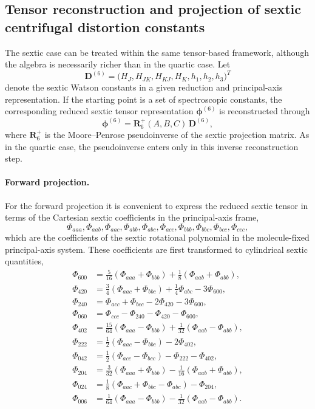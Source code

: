 \subsection{Tensor reconstruction and projection of sextic centrifugal distortion constants}

The sextic case can be treated within the same tensor-based framework,
although the algebra is necessarily richer than in the quartic case.
Let
\[
\mathbf D^{(6)} =
\bigl(
H_J,H_{JK},H_{KJ},H_K,h_1,h_2,h_3
\bigr)^T
\]
denote the sextic Watson constants in a given reduction and principal-axis
representation.  If the starting point is a set of spectroscopic constants, the
corresponding reduced sextic tensor representation
$\boldsymbol\phi^{(6)}$ is reconstructed through
\begin{equation}
\boldsymbol\phi^{(6)}=
\mathbf R_6^{+}(A,B,C)\,\mathbf D^{(6)},
\label{eq:sextic_pseudoinverse}
\end{equation}
where $\mathbf R_6^{+}$ is the Moore--Penrose pseudoinverse of the sextic
projection matrix.  As in the quartic case, the pseudoinverse enters only in
this inverse reconstruction step.

\paragraph{Forward projection.}

For the forward projection it is convenient to express the reduced sextic tensor
in terms of the Cartesian sextic coefficients in the principal-axis frame,
\[
\Phi_{aaa},\Phi_{aab},\Phi_{aac},\Phi_{abb},\Phi_{abc},\Phi_{acc},
\Phi_{bbb},\Phi_{bbc},\Phi_{bcc},\Phi_{ccc},
\]
which are the coefficients of the sextic rotational polynomial in the
molecule-fixed principal-axis system.
These coefficients are first transformed to cylindrical sextic quantities,
\begin{align}
\Phi_{600} &= \frac{5}{16}(\Phi_{aaa}+\Phi_{bbb})
+\frac{1}{8}(\Phi_{aab}+\Phi_{abb}),\\
\Phi_{420} &= \frac{3}{4}(\Phi_{aac}+\Phi_{bbc})
+\frac{1}{4}\Phi_{abc}-3\Phi_{600},\\
\Phi_{240} &= \Phi_{acc}+\Phi_{bcc}-2\Phi_{420}-3\Phi_{600},\\
\Phi_{060} &= \Phi_{ccc}-\Phi_{240}-\Phi_{420}-\Phi_{600},\\
\Phi_{402} &= \frac{15}{64}(\Phi_{aaa}-\Phi_{bbb})
+\frac{1}{32}(\Phi_{aab}-\Phi_{abb}),\\
\Phi_{222} &= \frac{1}{2}(\Phi_{aac}-\Phi_{bbc})-2\Phi_{402},\\
\Phi_{042} &= \frac{1}{2}(\Phi_{acc}-\Phi_{bcc})
-\Phi_{222}-\Phi_{402},\\
\Phi_{204} &= \frac{3}{32}(\Phi_{aaa}+\Phi_{bbb})
-\frac{1}{16}(\Phi_{aab}+\Phi_{abb}),\\
\Phi_{024} &= \frac{1}{8}(\Phi_{aac}+\Phi_{bbc}-\Phi_{abc})
-\Phi_{204},\\
\Phi_{006} &= \frac{1}{64}(\Phi_{aaa}-\Phi_{bbb})
-\frac{1}{32}(\Phi_{aab}-\Phi_{abb}).
\label{eq:sextic_cylindrical}
\end{align}

